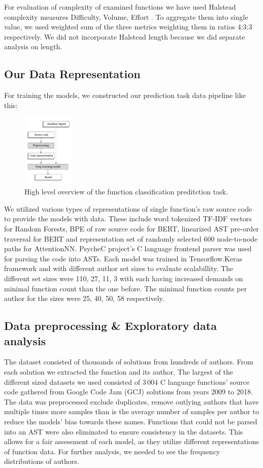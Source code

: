 \documentclass{article}
\begin{document}
For evaluation of complexity of examined functions we have used Halstead complexity 
measures Difficulty, Volume, Effort \cite{halstead}. To aggregate them into single value, 
we used weighted sum of the three metrics weighting them in ratios 4:3:3 respectively. 
We did not incorporate Halstead length because we did separate analysis on length.

\subsection{Our Data Representation}
For training the models, we constructed our prediction task data pipeline like this:

\begin{figure}[H]
    \centering
    \includegraphics[width=2.5cm, height=3.5cm]{figures/high_level_prediciton_task.png}
    \caption{\cite{compiler_based} High level overview of the function classification preditction task.}
    \label{fig:predictive_task}
\end{figure}

We utilized various 
types of representations of single function's raw source code to provide the models with data.
These include word tokenized TF-IDF vectors for Random Forests, BPE of raw source code for
BERT, linearized AST pre-order traversal for BERT and representation set of randomly selected 600 node-to-node paths for AttentionNN.  
PsycheC project's C language frontend parser \cite{psychec} was used for parsing the code into ASTs. Each model was trained in Tensorflow.Keras framework and with different author set sizes to evaluate scalabillity. The different set sizes were
110, 27, 11, 3 with each having increased demands on minimal function count than the one before. The minimal function counts per author for the sizes were 25, 40, 50, 58 respectively.

\subsection{Data preprocessing \& Exploratory data analysis}
The dataset consisted of thousands of solutions from hundreds of authors. From each solution we extracted the function and its author.
The largest of the different sized datasets we used consisted of $3\,004$ C language functions' source code gathered from Google Code Jam (GCJ) solutions from years 2009 to 2018. The data was preprocessed exclude duplicates, 
remove outlying authors that have multiple times more samples than is the average number of samples per author to reduce the models' bias towards these names. Functions 
that could not be parsed into an AST were also eliminated to ensure consistency in the datasets. This allows for a fair assessment of each model, 
as they utilize different representations of function data. For further analysis, we needed to see the frequency distributions of authors. 
\end{document}
